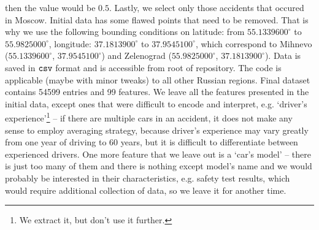 then the value would be $0.5$.
Lastly, we select only those accidents that occured in Moscow. Initial data has some flawed points that need to be removed.
That is why we use the following bounding conditions on latitude: from $55.1339600^\circ$ to $55.9825000^\circ$,
longitude: $37.1813900^\circ$ to $37.9545100^\circ$, which
correspond to Mihnevo ($55.1339600^\circ$, $37.9545100^\circ$) and Zelenograd ($55.9825000^\circ$, $37.1813900^\circ$).
Data is saved in $\verb|csv|$ format and is accessible from root of repository. The code is applicable (maybe with minor tweaks)
to all other Russian regions.
Final dataset contains 54599 entries and 99 features. We leave all the features presented in the initial data, except ones that were difficult to
encode and interpret, e.g. `driver's experience'\footnote{We extract it, but don't use it further.} – 
if there are multiple cars in an accident, it does not make any sense to employ averaging strategy,
because driver's experience may vary greatly from one year of driving to 60 years, but it is difficult to differentiate between experienced drivers.
One more feature that we leave out is a `car's model' – there is just too many of them and there is nothing except model's name
and we would probably be interested in their characteristics, e.g. safety test results,
which would require additional collection of data, so we leave it for another time.
